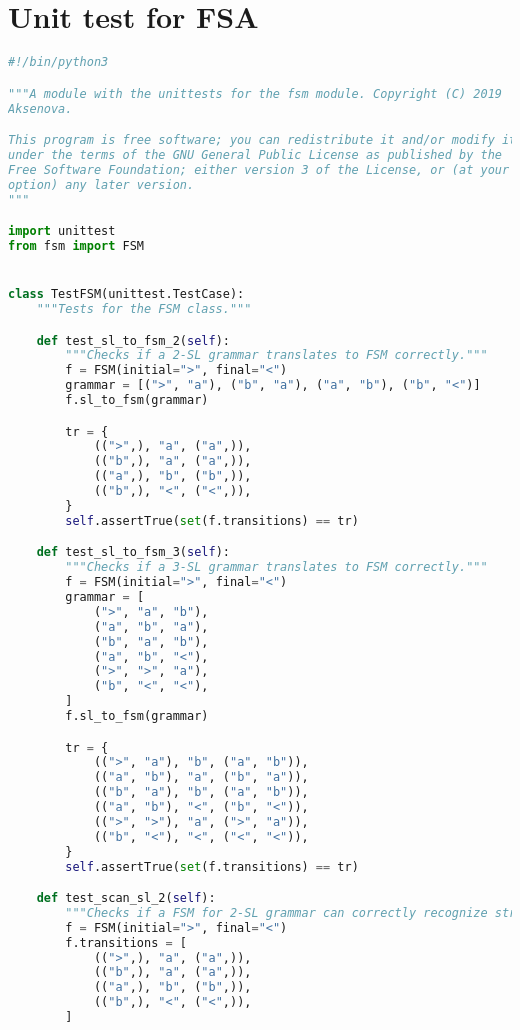 \section{Unit test for FSA}

\begin{lstlisting}[language=Python]
#!/bin/python3

"""A module with the unittests for the fsm module. Copyright (C) 2019  Alena
Aksenova.

This program is free software; you can redistribute it and/or modify it
under the terms of the GNU General Public License as published by the
Free Software Foundation; either version 3 of the License, or (at your
option) any later version.
"""

import unittest
from fsm import FSM


class TestFSM(unittest.TestCase):
    """Tests for the FSM class."""

    def test_sl_to_fsm_2(self):
        """Checks if a 2-SL grammar translates to FSM correctly."""
        f = FSM(initial=">", final="<")
        grammar = [(">", "a"), ("b", "a"), ("a", "b"), ("b", "<")]
        f.sl_to_fsm(grammar)

        tr = {
            ((">",), "a", ("a",)),
            (("b",), "a", ("a",)),
            (("a",), "b", ("b",)),
            (("b",), "<", ("<",)),
        }
        self.assertTrue(set(f.transitions) == tr)

    def test_sl_to_fsm_3(self):
        """Checks if a 3-SL grammar translates to FSM correctly."""
        f = FSM(initial=">", final="<")
        grammar = [
            (">", "a", "b"),
            ("a", "b", "a"),
            ("b", "a", "b"),
            ("a", "b", "<"),
            (">", ">", "a"),
            ("b", "<", "<"),
        ]
        f.sl_to_fsm(grammar)

        tr = {
            ((">", "a"), "b", ("a", "b")),
            (("a", "b"), "a", ("b", "a")),
            (("b", "a"), "b", ("a", "b")),
            (("a", "b"), "<", ("b", "<")),
            ((">", ">"), "a", (">", "a")),
            (("b", "<"), "<", ("<", "<")),
        }
        self.assertTrue(set(f.transitions) == tr)

    def test_scan_sl_2(self):
        """Checks if a FSM for 2-SL grammar can correctly recognize strings."""
        f = FSM(initial=">", final="<")
        f.transitions = [
            ((">",), "a", ("a",)),
            (("b",), "a", ("a",)),
            (("a",), "b", ("b",)),
            (("b",), "<", ("<",)),
        ]


\end{lstlisting}
